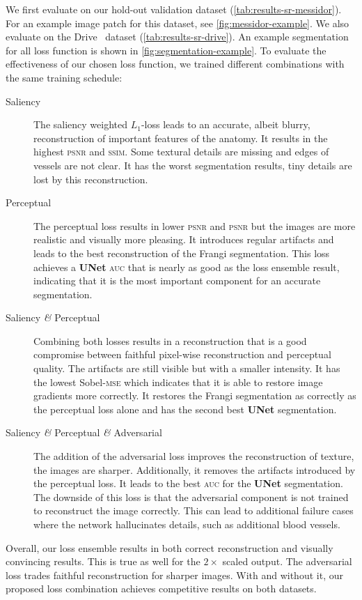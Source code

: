 \documentclass{scrartcl}
\begin{document}
We first evaluate on our hold-out validation dataset (\cref{tab:results-sr-messidor}).
For an example image patch for this dataset, see \cref{fig:messidor-example}.
We also evaluate on the Drive~\cite{Drive} dataset (\cref{tab:results-sr-drive}). 
An example segmentation for all loss function is shown in \cref{fig:segmentation-example}.
To evaluate the effectiveness of our chosen loss function, we trained different combinations with the same training schedule:
\begin{description}
\item[Saliency] The saliency weighted $L_1$-loss leads to an accurate, albeit blurry, reconstruction of important features of the anatomy.
  It results in the highest \textsc{psnr} and \textsc{ssim}.
  Some textural details are missing and edges of vessels are not clear.
  It has the worst segmentation results, tiny details are lost by this reconstruction.
\item[Perceptual] The perceptual loss results in lower \textsc{psnr} and \textsc{psnr} but the images are more realistic and visually more pleasing.
  It introduces regular artifacts and leads to the best reconstruction of the Frangi segmentation.
  This loss achieves a \textbf{UNet} \textsc{auc} that is nearly as good as the loss ensemble result, indicating that it is the most important component for an accurate segmentation.
\item[Saliency \textit{\&} Perceptual] Combining both losses results in a reconstruction that is a good compromise between faithful pixel-wise reconstruction and perceptual quality.
  The artifacts are still visible but with a smaller intensity.
  It has the lowest Sobel-\textsc{mse} which indicates that it is able to restore image gradients more correctly.
  It restores the Frangi segmentation as correctly as the perceptual loss alone and has the second best \textbf{UNet} segmentation.
\item[Saliency \textit{\&} Perceptual \textit{\&} Adversarial]
  The addition of the adversarial loss improves the reconstruction of texture, the images are sharper.
  Additionally, it removes the artifacts introduced by the perceptual loss.
  It leads to the best \textsc{auc} for the \textbf{UNet} segmentation.
  The downside of this loss is that the adversarial component is not trained to reconstruct the image correctly.
  This can lead to additional failure cases where the network hallucinates details, such as additional blood vessels.
\end{description}
Overall, our loss ensemble results in both correct reconstruction and visually convincing results.
This is true as well for the $2 \times$ scaled output.
The adversarial loss trades faithful reconstruction for sharper images.
With and without it, our proposed loss combination achieves competitive results on both datasets.
\end{document}
